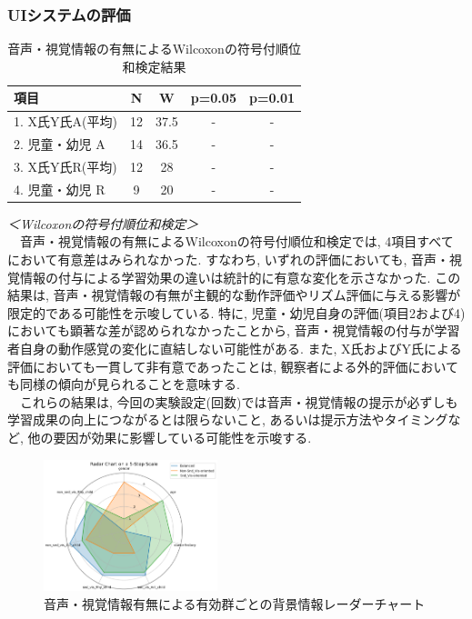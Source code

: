 \documentclass[paper]{ieicej}
\begin{document}
\subsubsection{UIシステムの評価}
\begin{table}[t]
  \centering
  \caption{音声・視覚情報の有無によるWilcoxonの符号付順位和検定結果}
  \begin{tabularx}{\linewidth}{X c c c c}
    \toprule
      項目 & N & W & p=0.05 & p=0.01 \\
    \midrule
      1. X氏Y氏A(平均) & 12 & 37.5 & - & - \\
      2. 児童・幼児 A & 14 & 36.5 & - & - \\
      3. X氏Y氏R(平均) & 12 & 28 & - & - \\
      4. 児童・幼児 R & 9 & 20 & - & - \\
    \bottomrule
  \end{tabularx}
\end{table}
\textit{＜Wilcoxonの符号付順位和検定＞}\\
　音声・視覚情報の有無によるWilcoxonの符号付順位和検定では, 4項目すべてにおいて有意差はみられなかった. すなわち, いずれの評価においても, 音声・視覚情報の付与による学習効果の違いは統計的に有意な変化を示さなかった. この結果は, 音声・視覚情報の有無が主観的な動作評価やリズム評価に与える影響が限定的である可能性を示唆している. 特に, 児童・幼児自身の評価(項目2および4)においても顕著な差が認められなかったことから, 音声・視覚情報の付与が学習者自身の動作感覚の変化に直結しない可能性がある. また, X氏およびY氏による評価においても一貫して非有意であったことは, 観察者による外的評価においても同様の傾向が見られることを意味する. \\
　これらの結果は, 今回の実験設定(回数)では音声・視覚情報の提示が必ずしも学習成果の向上につながるとは限らないこと, あるいは提示方法やタイミングなど, 他の要因が効果に影響している可能性を示唆する. \\
\begin{figure}[t]
  \centering
  \includegraphics[width=0.45\textwidth]{./images/radar_chart.png}
  \caption{音声・視覚情報有無による有効群ごとの背景情報レーダーチャート}
  \label{fig:radar_chart}
\end{figure}
\end{document}
